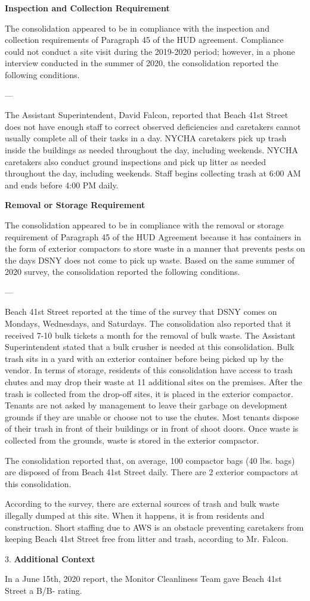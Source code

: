 

\textbf{Inspection and Collection Requirement}

The consolidation appeared to be in compliance with the inspection and collection requirements of Paragraph 45 of the HUD agreement. Compliance could not conduct a site visit during the 2019-2020 period; however, in a phone interview conducted in the summer of 2020, the consolidation reported the following conditions.

---

The Assistant Superintendent, David Falcon, reported that Beach 41st Street does not have enough staff to correct observed deficiencies and caretakers cannot usually complete all of their tasks in a day. NYCHA caretakers pick up trash inside the buildings as needed throughout the day, including weekends. NYCHA caretakers also conduct ground inspections and pick up litter as needed throughout the day, including weekends. Staff begins collecting trash at 6:00 AM and ends before 4:00 PM daily. 

\textbf{Removal or Storage Requirement}

The consolidation appeared to be in compliance with the  removal or storage requirement of Paragraph  45 of the HUD Agreement because it has containers in the form of exterior compactors to store waste in a manner that prevents pests on the days DSNY does not come to pick up waste. Based on the same summer of  2020 survey, the consolidation reported the following conditions.

---

Beach 41st Street reported at the time of the survey that DSNY comes on Mondays, Wednesdays, and Saturdays. The consolidation also reported that it received 7-10 bulk tickets a month for the removal of bulk waste. The Assistant Superintendent stated that a bulk crusher is needed at this consolidation. Bulk trash sits in a yard with an exterior container before being picked up by the vendor. In terms of storage, residents of this consolidation have access to trash chutes and may drop their waste at 11 additional sites on the premises. After the trash is collected from the drop-off sites, it is placed in the exterior compactor. Tenants are not asked by management to leave their garbage on development grounds if they are unable or choose not to use the chutes. Most tenants dispose of their trash in front of their buildings or in front of shoot doors. Once waste is collected from the grounds, waste is stored in the exterior compactor. 

The consolidation reported that, on average, 100 compactor bags (40 lbs. bags) are disposed of from Beach 41st Street daily. There are 2 exterior compactors at this consolidation.

According to the survey, there are external sources of trash and bulk waste illegally dumped at this site. When it happens, it is from residents and construction. Short staffing due to AWS is an obstacle preventing caretakers from keeping Beach 41st Street free from litter and trash, according to Mr. Falcon. 

3. \textbf{Additional Context} 

In a June 15th, 2020 report, the Monitor Cleanliness Team gave Beach 41st Street a B/B- rating. 